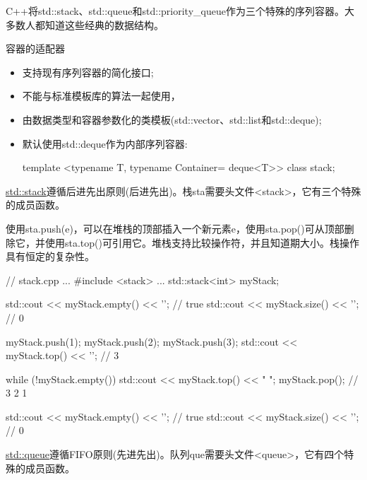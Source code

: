 C++将std::stack、std::queue和std::priority\_queue作为三个特殊的序列容器。大多数人都知道这些经典的数据结构。

容器的适配器

\begin{itemize}
\item 
支持现有序列容器的简化接口;

\item 
不能与标准模板库的算法一起使用，

\item 
由数据类型和容器参数化的类模板(std::vector、std::list和std::deque);

\item 
默认使用std::deque作为内部序列容器:

\begin{cpp}
template <typename T, typename Container= deque<T>>
class stack;
\end{cpp}
\end{itemize}



\href{http://en.cppreference.com/w/cpp/container/stack}{std::stack}遵循后进先出原则(后进先出)。栈sta需要头文件<stack>，它有三个特殊的成员函数。

使用sta.push(e)，可以在堆栈的顶部插入一个新元素e，使用sta.pop()可从顶部删除它，并使用sta.top()可引用它。堆栈支持比较操作符，并且知道期大小。栈操作具有恒定的复杂性。


\begin{cpp}
// stack.cpp
...
#include <stack>
...
std::stack<int> myStack;

std::cout << myStack.empty() << '\n'; // true
std::cout << myStack.size() << '\n'; // 0

myStack.push(1);
myStack.push(2);
myStack.push(3);
std::cout << myStack.top() << '\n'; // 3

while (!myStack.empty()){
	std::cout << myStack.top() << " ";
	myStack.pop();
} // 3 2 1

std::cout << myStack.empty() << '\n'; // true
std::cout << myStack.size() << '\n'; // 0
\end{cpp}




\href{http://en.cppreference.com/w/cpp/container/queue}{std::queue}遵循FIFO原则(先进先出)。队列que需要头文件<queue>，它有四个特殊的成员函数。

